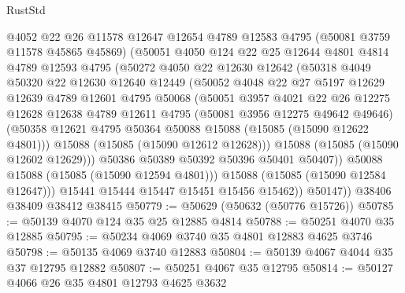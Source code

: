 \begin{lexlean}{RustStd}
\begin{coremodule}
              @4052
              @22
              @26
              @11578
              @12647
              @12654
              @4789
              @12583
              @4795
              (@50081 @3759 @11578 @45865 @45869)
              (@50051
                @4050
                @124
                @22
                @25
                @12644
                @4801
                @4814
                @4789
                @12593
                @4795
                (@50272
                  @4050
                  @22
                  @12630
                  @12642
                  (@50318
                    @4049
                    @50320
                    @22
                    @12630
                    @12640
                    @12449
                    (@50052
                      @4048
                      @22
                      @27
                      @5197
                      @12629
                      @12639
                      @4789
                      @12601
                      @4795
                      @50068
                      (@50051
                        @3957
                        @4021
                        @22
                        @26
                        @12275
                        @12628
                        @12638
                        @4789
                        @12611
                        @4795
                        (@50081 @3956 @12275 @49642 @49646)
                        (@50358 @12621 @4795 @50364 @50088 @15088 (@15085 (@15090 @12622 @4801)))
                        @15088
                        (@15085 (@15090 @12612 @12628)))
                      @15088
                      (@15085 (@15090 @12602 @12629)))
                    @50386
                    @50389
                    @50392
                    @50396
                    @50401
                    @50407))
                @50088
                @15088
                (@15085 (@15090 @12594 @4801)))
              @15088
              (@15085 (@15090 @12584 @12647)))
            @15441
            @15444
            @15447
            @15451
            @15456
            @15462))
        @50147))
    @38406
    @38409
    @38412
    @38415
@50779 := @50629 (@50632 (@50776 @15726))
@50785 := @50139 @4070 @124 @35 @25 @12885 @4814
@50788 := @50251 @4070 @35 @12885
@50795 := @50234 @4069 @3740 @35 @4801 @12883 @4625 @3746
@50798 := @50135 @4069 @3740 @12883
@50804 := @50139 @4067 @4044 @35 @37 @12795 @12882
@50807 := @50251 @4067 @35 @12795
@50814 := @50127 @4066 @26 @35 @4801 @12793 @4625 @3632

\end{coremodule}
\end{lexlean}
